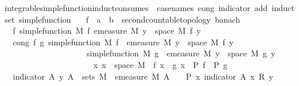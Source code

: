 \begin{isabellebody}
%
\isadelimimportant
%
\endisadelimimportant
%
\isatagimportant
{}\isamarkupfalse%
\ integrable{\isacharunderscore}{\kern0pt}simple{\isacharunderscore}{\kern0pt}function{\isacharunderscore}{\kern0pt}induct{\isacharbrackleft}{\kern0pt}consumes\ {}{\isacharcomma}{\kern0pt}\ case{\isacharunderscore}{\kern0pt}names\ cong\ indicator\ add{\isacharcomma}{\kern0pt}\ induct\ set{\isacharcolon}{\kern0pt}\ simple{\isacharunderscore}{\kern0pt}function{\isacharbrackright}{\kern0pt}{\isacharcolon}{\kern0pt}\isanewline
\ \ \ f\ {\isacharcolon}{\kern0pt}{\isacharcolon}{\kern0pt}\ {\isachardoublequoteopen}{\isacharprime}{\kern0pt}a\ {\isasymRightarrow}\ {\isacharprime}{\kern0pt}b\ {\isacharcolon}{\kern0pt}{\isacharcolon}{\kern0pt}\ {\isacharbraceleft}{\kern0pt}second{\isacharunderscore}{\kern0pt}countable{\isacharunderscore}{\kern0pt}topology{\isacharcomma}{\kern0pt}\ banach{\isacharbraceright}{\kern0pt}{\isachardoublequoteclose}\isanewline
\ \ \ f{\isacharcolon}{\kern0pt}\ {\isachardoublequoteopen}simple{\isacharunderscore}{\kern0pt}function\ M\ f{\isachardoublequoteclose}\ {\isachardoublequoteopen}emeasure\ M\ {\isacharbraceleft}{\kern0pt}y\ {\isasymin}\ space\ M{\isachardot}{\kern0pt}\ f\ y\ {\isasymnoteq}\ {}{\isacharbraceright}{\kern0pt}\ {\isasymnoteq}\ {\isasyminfinity}{\isachardoublequoteclose}\isanewline
\ \ \ cong{\isacharcolon}{\kern0pt}\ {\isachardoublequoteopen}{\isasymAnd}f\ g{\isachardot}{\kern0pt}\ simple{\isacharunderscore}{\kern0pt}function\ M\ f\ {\isasymLongrightarrow}\ emeasure\ M\ {\isacharbraceleft}{\kern0pt}y\ {\isasymin}\ space\ M{\isachardot}{\kern0pt}\ f\ y\ {\isasymnoteq}\ {}{\isacharbraceright}{\kern0pt}\ {\isasymnoteq}\ {\isasyminfinity}\ \isanewline
\ \ \ \ \ \ \ \ \ \ \ \ \ \ \ \ \ \ \ \ {\isasymLongrightarrow}\ simple{\isacharunderscore}{\kern0pt}function\ M\ g\ {\isasymLongrightarrow}\ emeasure\ M\ {\isacharbraceleft}{\kern0pt}y\ {\isasymin}\ space\ M{\isachardot}{\kern0pt}\ g\ y\ {\isasymnoteq}\ {}{\isacharbraceright}{\kern0pt}\ {\isasymnoteq}\ {\isasyminfinity}\ \isanewline
\ \ \ \ \ \ \ \ \ \ \ \ \ \ \ \ \ \ \ \ {\isasymLongrightarrow}\ {\isacharparenleft}{\kern0pt}{\isasymAnd}x{\isachardot}{\kern0pt}\ x\ {\isasymin}\ space\ M\ {\isasymLongrightarrow}\ f\ x\ {\isacharequal}{\kern0pt}\ g\ x{\isacharparenright}{\kern0pt}\ {\isasymLongrightarrow}\ P\ f\ {\isasymLongrightarrow}\ P\ g{\isachardoublequoteclose}\isanewline
\ \ \ indicator{\isacharcolon}{\kern0pt}\ {\isachardoublequoteopen}{\isasymAnd}A\ y{\isachardot}{\kern0pt}\ A\ {\isasymin}\ sets\ M\ {\isasymLongrightarrow}\ emeasure\ M\ A\ {\isacharless}{\kern0pt}\ {\isasyminfinity}\ {\isasymLongrightarrow}\ P\ {\isacharparenleft}{\kern0pt}{\isasymlambda}x{\isachardot}{\kern0pt}\ indicator\ A\ x\ {\isacharasterisk}{\kern0pt}\isactrlsub R\ y{\isacharparenright}{\kern0pt}{\isachardoublequoteclose}\isanewline

\end{isabellebody}
